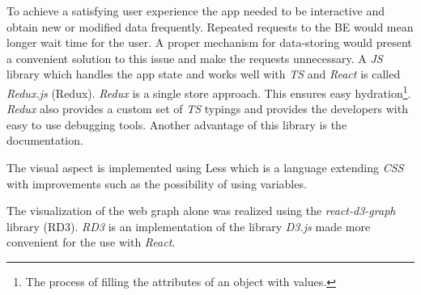 To achieve a satisfying user experience the app needed to be interactive and obtain new or modified data frequently. Repeated requests to the BE would mean longer wait time for the user. A proper mechanism for data-storing would present a convenient solution to this issue and make the requests unnecessary. A \textit{JS} library which handles the app state and works well with \textit{TS} and \textit{React} is called \textit{Redux.js} \cite{redux} (Redux). \textit{Redux} is a single store approach. This ensures easy hydration\footnote{The process of filling the attributes of an object with values.}. \textit{Redux} also provides a custom set of \textit{TS} typings and provides the developers with easy to use debugging tools. Another advantage of this library is the documentation.

The visual aspect is implemented using Less \cite{less} which is a language extending \textit{CSS} with improvements such as the possibility of using variables.

The visualization of the web graph alone was realized using the \textit{react-d3-graph} library \cite{reactD3Graph} (RD3). \textit{RD3} is 
an implementation of the library \textit{D3.js} \cite{d3} made more convenient for the use with \textit{React}. 

